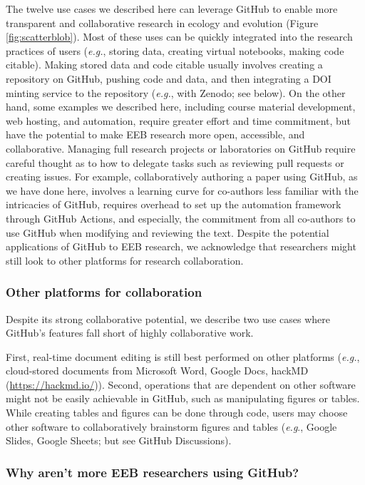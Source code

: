 The twelve use cases we described here can leverage GitHub to enable more transparent and collaborative research in ecology and evolution (Figure \ref{fig:scatterblob}).
Most of these uses can be quickly integrated into the research practices of users (\emph{e.g.}, storing data, creating virtual notebooks, making code citable).
Making stored data and code citable usually involves creating a repository on GitHub, pushing code and data, and then integrating a DOI minting service to the repository (\emph{e.g.}, with Zenodo; see below).
On the other hand, some examples we described here, including course material development, web hosting, and automation, require greater effort and time commitment, but have the potential to make EEB research more open, accessible, and collaborative.
Managing full research projects or laboratories on GitHub require careful thought as to how to delegate tasks such as reviewing pull requests or creating issues.
For example, collaboratively authoring a paper using GitHub, as we have done here, involves a learning curve for co-authors less familiar with the intricacies of GitHub, requires overhead to set up the automation framework through GitHub Actions, and especially, the commitment from all co-authors to use GitHub when modifying and reviewing the text.
Despite the potential applications of GitHub to EEB research, we acknowledge that researchers might still look to other platforms for research collaboration.

\hypertarget{other-platforms-for-collaboration}{%
\subsubsection{Other platforms for collaboration}\label{other-platforms-for-collaboration}}

Despite its strong collaborative potential, we describe two use cases where GitHub's features fall short of highly collaborative work.

First, real-time document editing is still best performed on other platforms (\emph{e.g.}, cloud-stored documents from Microsoft Word, Google Docs, hackMD (\url{https://hackmd.io/})).
Second, operations that are dependent on other software might not be easily achievable in GitHub, such as manipulating figures or tables.
While creating tables and figures can be done through code, users may choose other software to collaboratively brainstorm figures and tables (\emph{e.g}., Google Slides, Google Sheets; but see GitHub Discussions).

\hypertarget{why-arent-more-eeb-researchers-using-github}{%
\subsubsection{Why aren't more EEB researchers using GitHub?}\label{why-arent-more-eeb-researchers-using-github}}

